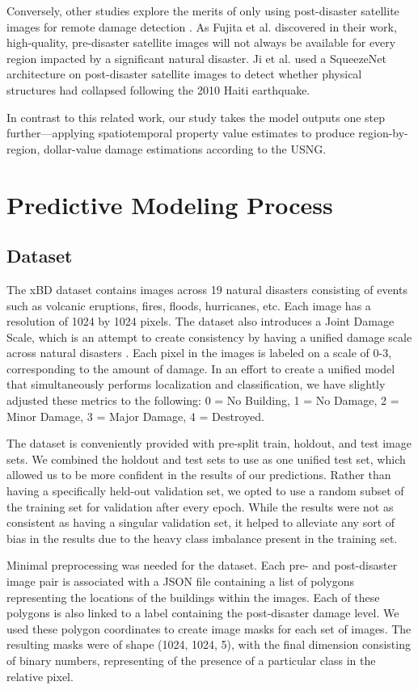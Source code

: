 \documentclass[conference]{IEEEtran}
\begin{document}
Conversely, other studies explore the merits of only using post-disaster satellite images for remote damage detection \cite{a7}. As Fujita et al. \cite{a3} discovered in their work, high-quality, pre-disaster satellite images will not always be available for every region impacted by a significant natural disaster. Ji et al. \cite{a7} used a SqueezeNet architecture\cite{a8} on post-disaster satellite images to detect whether physical structures had collapsed following the 2010 Haiti earthquake.

In contrast to this related work, our study takes the model outputs one step further---applying spatiotemporal property value estimates to produce region-by-region, dollar-value damage estimations according to the USNG.  

\section{Predictive Modeling Process}
\subsection{Dataset}
The xBD dataset contains images across 19 natural disasters consisting of events such as volcanic eruptions, fires, floods, hurricanes, etc. Each image has a resolution of 1024 by 1024 pixels. The dataset also introduces a Joint Damage Scale, which is an attempt to create consistency by having a unified damage scale across natural disasters \cite{a1}. Each pixel in the images is labeled on a scale of 0-3, corresponding to the amount of damage. In an effort to create a unified model that simultaneously performs localization and classification, we have slightly adjusted these metrics to the following: 0 = No Building, 1 = No Damage, 2 = Minor Damage, 3 = Major Damage, 4 = Destroyed.

The dataset is conveniently provided with pre-split train, holdout, and test image sets. We combined the holdout and test sets to use as one unified test set, which allowed us to be more confident in the results of our predictions. Rather than having a specifically held-out validation set, we opted to use a random subset of the training set for validation after every epoch. While the results were not as consistent as having a singular validation set, it helped to alleviate any sort of bias in the results due to the heavy class imbalance present in the training set. 

Minimal preprocessing was needed for the dataset. Each pre- and post-disaster image pair is associated with a JSON file containing a list of polygons representing the locations of the buildings within the images. Each of these polygons is also linked to a label containing the post-disaster damage level. We used these polygon coordinates to create image masks for each set of images. The resulting masks were of shape (1024, 1024, 5), with the final dimension consisting of binary numbers, representing of the presence of a particular class in the relative pixel.
\end{document}
